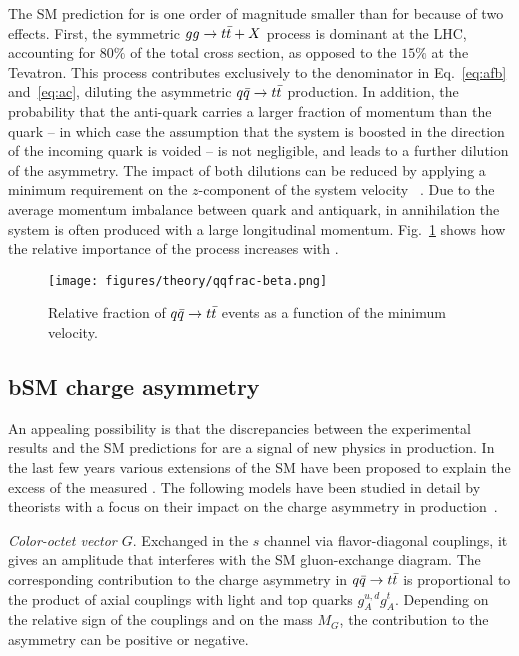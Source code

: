 The SM prediction for \ac{} is one order of magnitude smaller than for
\afb{} because of two effects. First, the symmetric $gg\to\mbox{$t\bar{t}$}{}+X$
process is dominant at the LHC, accounting for $80\%$ of the total
cross section, as opposed to the $15\%$ at the Tevatron. This process
contributes exclusively to the denominator in Eq.~\ref{eq:afb}
and~\ref{eq:ac}, diluting the asymmetric $\mbox{$q\bar{q}$}{}\to\mbox{$t\bar{t}$}{}$
production. In addition, the probability that the anti-quark carries a
larger fraction of momentum than the quark -- in which case the
assumption that the \ttbar{} system is boosted in the direction of the
incoming quark is voided -- is not negligible, and leads to a further
dilution of the asymmetry. The impact of both
dilutions can be reduced by applying a minimum requirement on the
$z$-component of the \ttbar{} system velocity \betatt{}~\cite{AguilarSaavedra:2011cp}. Due to the average momentum imbalance
between quark and antiquark, in \qqbar{} annihilation the \ttbar{}
system is often produced with a large longitudinal
momentum. Fig.~\ref{fig:qqbarfrac} shows how the relative importance
of the \qqbar{} process increases with \betatt{}.

\begin{figure}[!htb]
  \centering
  \texttt{[image: figures/theory/qqfrac-beta.png]} 
  \caption{Relative fraction of $\mbox{$q\bar{q}$}{}\to\mbox{$t\bar{t}$}{}$ events as a function of the
    minimum \ttbar{} velocity.} 
  \label{fig:qqbarfrac}
\end{figure}

\subsection{bSM charge asymmetry}
\label{sec:bsmca}

An appealing possibility is that the discrepancies between the
experimental results and the SM predictions for \afb{} are a signal of
new physics in \ttbar{} production. In the last few years various
extensions of the SM have been proposed to explain the excess of the
measured \afb{}. The following models have been studied in
detail by theorists with a focus on their impact on the charge
asymmetry in \ttbar{} production~\cite{Aguilar-Saavedra:2014kpa}. 

{\em Color-octet vector $G$}. Exchanged in the $s$ channel via
flavor-diagonal couplings, it gives 
an amplitude that interferes with the SM gluon-exchange diagram. The
corresponding contribution to the charge asymmetry in
$\mbox{$q\bar{q}$}{}\to\mbox{$t\bar{t}$}{}$ is proportional to the product of axial
couplings with light and top quarks $g_A^{u,d}g_A^t$. Depending on the
relative sign of the couplings and on the mass $M_G$, the contribution
to the asymmetry can be positive or negative. 

